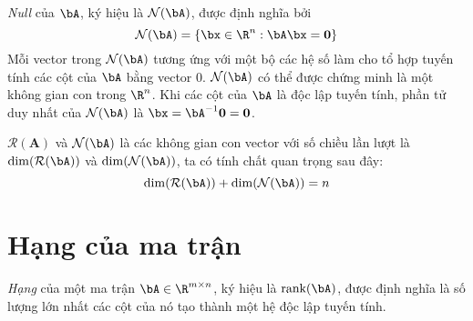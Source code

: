 \textit{Null} của $\bA$, ký hiệu là $\mathcal{N}(\bA)$, được định nghĩa bởi
    \begin{equation}
        \mathcal{N}(\bA) = \{\bx \in \R^n : \bA\bx = \mathbf{0}\}
    \end{equation}
    Mỗi vector trong $\mathcal{N}(\bA)$ tương ứng với một bộ các hệ số làm cho
    tổ hợp tuyến tính các cột của $\bA$ bằng vector 0. $\mathcal{N}(\bA)$ có thể
    được chứng minh là một không gian con trong $\R^n$. Khi các cột của $\bA$ là
    độc lập tuyến tính, phần tử duy nhất của $\mathcal{N}(\bA)$ là $\bx = \bA^{-1}\mathbf{0} = \mathbf{0}$. 


$\mathcal{R}(\mathbf{A})$ và $\mathcal{N}(\bA)$ là các không gian con vector
với số chiều lần lượt là $\dim(\mathcal{R}(\bA))$ và $\dim(\mathcal{N}(\bA))$,
ta có tính chất quan trọng sau đây:
\begin{equation}
    \dim(\mathcal{R}(\bA)) + \dim(\mathcal{N}(\bA)) = n
\end{equation}

\def\rank{\text{rank}}
\section{Hạng của ma trận} %
\label{sec:hang_cua_ma_tran}
\textit{Hạng} của một ma trận $\bA \in \R^{m \times n}$, ký hiệu là
$\rank(\bA)$, được định nghĩa là số lượng lớn nhất các cột của nó tạo thành một
hệ độc lập tuyến tính.

